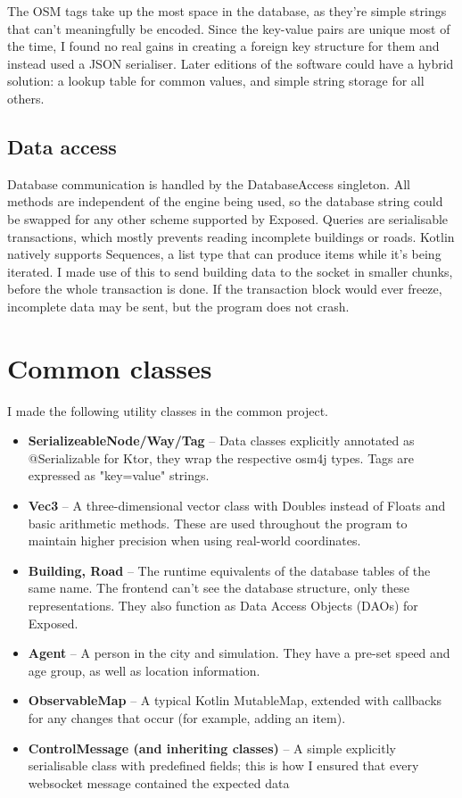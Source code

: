 The OSM tags take up the most space in the database, as they're simple strings that can't meaningfully be encoded. Since the key-value pairs are unique most of the time, I found no real gains in creating a foreign key structure for them and instead used a JSON serialiser. Later editions of the software could have a hybrid solution: a lookup table for common values, and simple string storage for all others.



\subsection{Data access}

Database communication is handled by the DatabaseAccess singleton. All methods are independent of the engine being used, so the database string could be swapped for any other scheme supported by Exposed. Queries are serialisable transactions, which mostly prevents reading incomplete buildings or roads. Kotlin natively supports Sequences, a list type that can produce items while it's being iterated. I made use of this to send building data to the socket in smaller chunks, before the whole transaction is done. If the transaction block would ever freeze, incomplete data may be sent, but the program does not crash.

\section{Common classes}

I made the following utility classes in the common project. \begin{itemize}
    \item \textbf{SerializeableNode/Way/Tag} -- Data classes explicitly annotated as @Serializable for Ktor, they wrap the respective osm4j types. Tags are expressed as "key=value" strings.
    \item \textbf{Vec3} -- A three-dimensional vector class with Doubles instead of Floats and basic arithmetic methods. These are used throughout the program to maintain higher precision when using real-world coordinates.
    \item \textbf{Building, Road} -- The runtime equivalents of the database tables of the same name. The frontend can't see the database structure, only these representations. They also function as Data Access Objects (DAOs) for Exposed.
    \item \textbf{Agent} -- A person in the city and simulation. They have a pre-set speed and age group, as well as location information.
    \item \textbf{ObservableMap} -- A typical Kotlin MutableMap, extended with callbacks for any changes that occur (for example, adding an item).
    \item \textbf{ControlMessage (and inheriting classes)} -- A simple explicitly serialisable class with predefined fields; this is how I ensured that every websocket message contained the expected data
\end{itemize}

